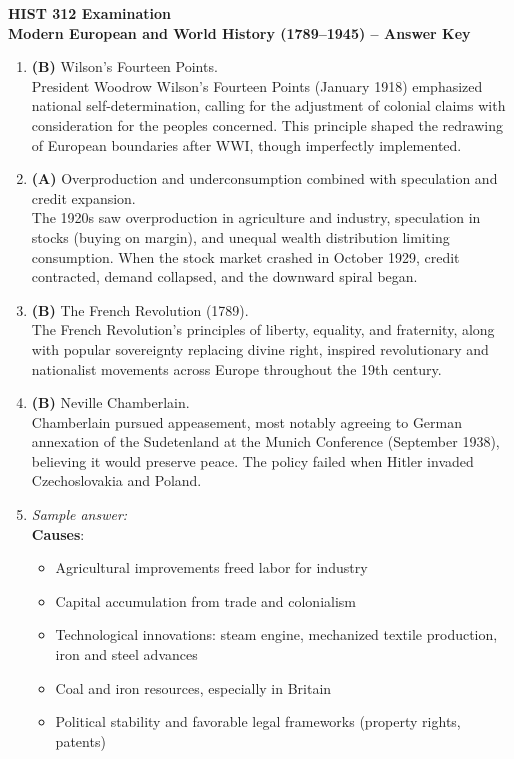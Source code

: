 \documentclass[11pt]{article}
\begin{document}
\begin{center}
  {\Large \textbf{HIST 312 Examination}}\\[0.25em]
  {\large \textbf{Modern European and World History (1789--1945) -- Answer Key}}\\[0.5em]
\end{center}

\begin{enumerate}[label=\textbf{\arabic*.}]

  \item \textbf{(B)} Wilson's Fourteen Points.\\
  President Woodrow Wilson's Fourteen Points (January 1918) emphasized national self-determination, 
  calling for the adjustment of colonial claims with consideration for the peoples concerned. This 
  principle shaped the redrawing of European boundaries after WWI, though imperfectly implemented.

  \item \textbf{(A)} Overproduction and underconsumption combined with speculation and credit expansion.\\
  The 1920s saw overproduction in agriculture and industry, speculation in stocks (buying on margin), 
  and unequal wealth distribution limiting consumption. When the stock market crashed in October 1929, 
  credit contracted, demand collapsed, and the downward spiral began.

  \item \textbf{(B)} The French Revolution (1789).\\
  The French Revolution's principles of liberty, equality, and fraternity, along with popular 
  sovereignty replacing divine right, inspired revolutionary and nationalist movements across Europe 
  throughout the 19th century.

  \item \textbf{(B)} Neville Chamberlain.\\
  Chamberlain pursued appeasement, most notably agreeing to German annexation of the Sudetenland at 
  the Munich Conference (September 1938), believing it would preserve peace. The policy failed when 
  Hitler invaded Czechoslovakia and Poland.

  \item \emph{Sample answer:}\\
  \textbf{Causes}:
  \begin{itemize}
    \item Agricultural improvements freed labor for industry
    \item Capital accumulation from trade and colonialism
    \item Technological innovations: steam engine, mechanized textile production, iron and steel advances
    \item Coal and iron resources, especially in Britain
    \item Political stability and favorable legal frameworks (property rights, patents)
  \end{itemize}


\end{enumerate}
\end{document}
